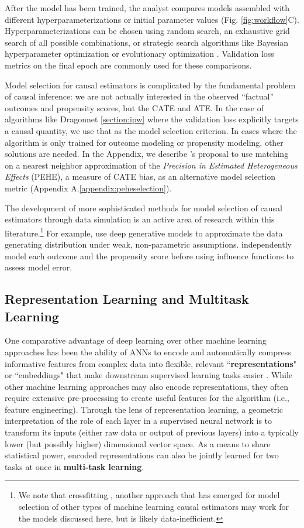 After the model has been trained, the analyst compares models assembled with different hyperparameterizations or initial parameter values (Fig. \ref{fig:workflow}C). Hyperparameterizations can be chosen using random search, an exhaustive grid search of all possible combinations, or strategic search algorithms like Bayesian hyperparameter optimization or evolutionary optimization \citep{snoek2012}. Validation loss metrics on the final epoch are commonly used for these comparisons. 

Model selection for causal estimators is complicated by the fundamental problem of causal inference: we are not actually interested in the observed “factual” outcomes and propensity scores, but the CATE and ATE. In the case of algorithms like Dragonnet \ref{section:ipw} where the validation loss explicitly targets a causal quantity, we use that as the model selection criterion. In cases where the algorithm is only trained for outcome modeling or propensity modeling, other solutions are needed. In the Appendix, we describe \citet{johannson2020}'s proposal to use matching on a nearest neighbor approximation of the \textit{Precision in Estimated Heterogeneous Effects} (PEHE), a measure of CATE bias, as an alternative model selection metric (Appendix A.\ref{appendix:peheselection}).

The development of more sophisticated methods for model selection of causal estimators through data simulation is an active area of research within this literature.\footnote{We note that crossfitting \citep{zivich2021machine}, another approach that has emerged for model selection of other types of machine learning causal estimators may work for the models discussed here, but is likely data-inefficient.} For example, \citet{parikh2022} use deep generative models to approximate the data generating distribution under weak, non-parametric assumptions. \citet{alaa2019validating} independently model each  outcome and the propensity score before using influence functions to assess model error.

\subsection{Representation Learning and Multitask Learning}

\label{section:replearning}
One comparative advantage of deep learning over other machine learning approaches has been the ability of ANNs to encode and automatically compress informative features from complex data into flexible, relevant ``\textbf{representations}" or ``embeddings" that make downstream supervised learning tasks easier \citep{Goodfellow-et-al-2016, bengio2013deep}. While other machine learning approaches may also encode representations, they often require extensive pre-processing to create useful features for the algorithm (i.e., feature engineering). Through the lens of representation learning, a geometric interpretation of the role of each layer in a supervised neural network is to transform its inputs (either raw data or output of previous layers) into a typically lower (but possibly higher) dimensional vector space. As a means to share statistical power, encoded representations can also be jointly learned for two tasks at once in \textbf{multi-task learning}. 

